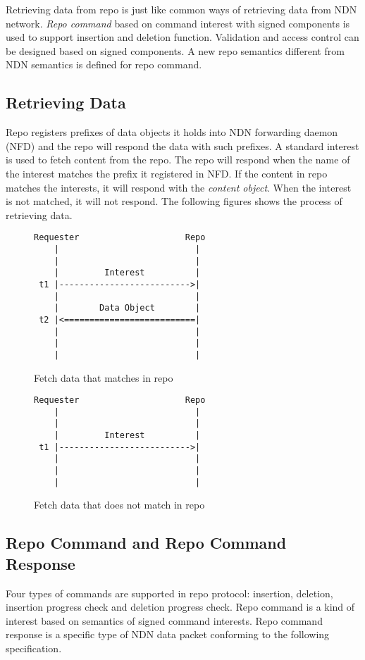 \documentclass{acm_proc_article-sp}
\begin{document}
Retrieving data from repo is just like common ways of retrieving data from NDN network. \emph{Repo command} based on command interest with signed components is used to support insertion and deletion function. Validation and access control can be designed based on signed components. A new repo semantics different from NDN semantics is defined for repo command.

\subsection{Retrieving Data}
Repo registers prefixes of data objects it holds into NDN forwarding daemon (NFD) and the repo will respond the data with such prefixes. A standard interest is used to fetch content from the repo. The repo will respond when the name of the interest matches the prefix it registered in NFD. If the content in repo matches the interests, it will respond with the \emph{content object}. When the interest is not matched, it will not respond. The following figures shows the process of retrieving data.

\begin{figure}
\centering
\begin{BVerbatim}
Requester                     Repo
    |                           |
    |                           |
    |         Interest          |
 t1 |-------------------------->|
    |                           |
    |        Data Object        |
 t2 |<==========================|
    |                           |
    |                           |
    |                           |
\end{BVerbatim}
\caption{Fetch data that matches in repo}
\end{figure}

\begin{figure}
\centering
\begin{BVerbatim}
Requester                     Repo
    |                           |
    |                           |
    |         Interest          |
 t1 |-------------------------->|
    |                           |
    |                           |
    |                           |
\end{BVerbatim}
\caption{Fetch data that does not match in repo}
\end{figure}

\subsection{Repo Command and Repo Command Response}
Four types of commands are supported in repo protocol: insertion, deletion, insertion progress check and deletion progress check. Repo command is a kind of interest based on semantics of signed command interests. Repo command response is a specific type of NDN data packet conforming to the following specification.
\end{document}
